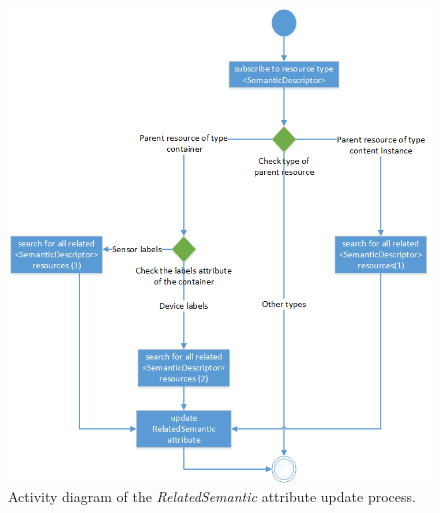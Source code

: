 \begin{figure}[htbp]
    \centering
    \includegraphics[width=1\textwidth]{resources/images/rsdiagram}
    \caption{Activity diagram of the \textit{RelatedSemantic} attribute update process. }\label{fig:contrib2:rs2}
\end{figure}

